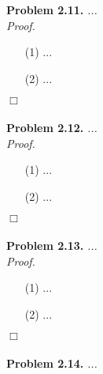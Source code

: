 \documentclass{article}
\begin{document}



\textbf{Problem 2.11.}
\emph{...} \\



\emph{Proof.}
\begin{enumerate}
\item[(1)]
  ...

\item[(2)]
  ...
\end{enumerate}
$\Box$ \\\\






\textbf{Problem 2.12.}
\emph{...} \\



\emph{Proof.}
\begin{enumerate}
\item[(1)]
  ...

\item[(2)]
  ...
\end{enumerate}
$\Box$ \\\\






\textbf{Problem 2.13.}
\emph{...} \\



\emph{Proof.}
\begin{enumerate}
\item[(1)]
  ...

\item[(2)]
  ...
\end{enumerate}
$\Box$ \\\\






\textbf{Problem 2.14.}
\emph{...} \\
\end{document}
